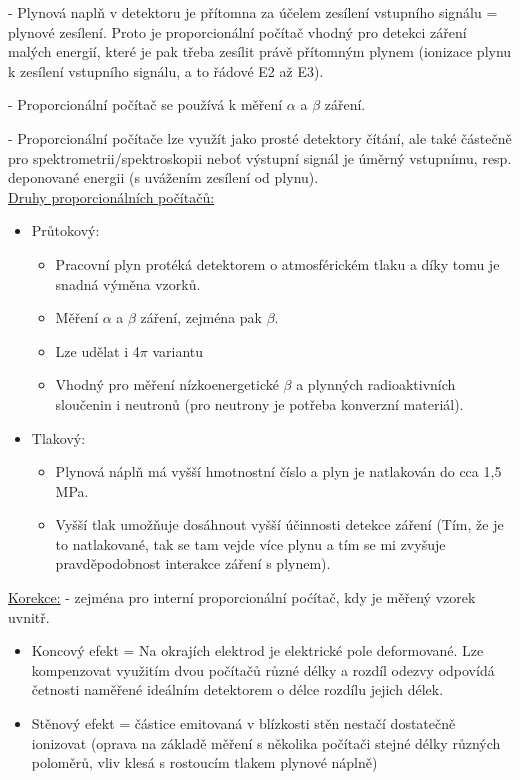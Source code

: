 - Plynová naplň v detektoru je přítomna za účelem zesílení vstupního signálu = plynové zesílení. Proto je proporcionální počítač vhodný pro detekci záření malých energií, které je pak třeba zesílit právě přítomným plynem (ionizace plynu k zesílení vstupního signálu, a to řádové E2 až E3).

- Proporcionální počítač se používá k měření $\alpha$ a $\beta$ záření.

- Proporcionální počítače lze využít jako prosté detektory čítání, ale také částečně pro spektrometrii/spektroskopii neboť výstupní signál je úměrný vstupnímu, resp. deponované energii (s uvážením zesílení od plynu).
\\

\underline{Druhy proporcionálních počítačů:}
\begin{itemize}
    \item Průtokový: 
        \begin{itemize}
            \item Pracovní plyn protéká detektorem o atmosférickém tlaku a díky tomu je snadná výměna vzorků.
            \item Měření $\alpha$ a $\beta$ záření, zejména pak $\beta$.
            \item Lze udělat i 4$\pi$ variantu
            \item Vhodný pro měření nízkoenergetické $\beta$ a plynných radioaktivních sloučenin i neutronů (pro neutrony je potřeba konverzní materiál).
        \end{itemize}
    
    \item Tlakový: 
    \begin{itemize}
            \item Plynová náplň má vyšší hmotnostní číslo a plyn je natlakován do cca 1,5 MPa.
            \item Vyšší tlak umožňuje dosáhnout vyšší účinnosti detekce záření (Tím, že je to natlakované, tak se tam vejde více plynu a tím se mi zvyšuje pravděpodobnost interakce záření s plynem).
        \end{itemize}
    
\end{itemize}


\underline{Korekce:} - zejména pro interní proporcionální poćítač, kdy je měřený vzorek uvnitř.
\begin{itemize}
    \item Koncový efekt = Na okrajích elektrod je elektrické pole deformované. Lze kompenzovat využitím dvou počítačů různé délky a rozdíl odezvy odpovídá četnosti naměřené ideálním detektorem o délce rozdílu jejich délek.
    \item Stěnový efekt = částice emitovaná v blízkosti stěn nestačí dostatečně ionizovat (oprava na základě
měření s několika počítači stejné délky různých poloměrů, vliv klesá s rostoucím tlakem plynové náplně)
\end{itemize}


